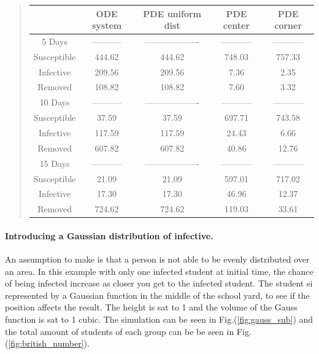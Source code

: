 \documentclass[%
twoside,                 %
final,                   %
10pt]{article}
\begin{document}
\label{table:british_number_table}

\begin{quote}
\begin{tabular}{ccccc}
\hline
\multicolumn{1}{c}{  } & \multicolumn{1}{c}{ ODE system } & \multicolumn{1}{c}{ PDE uniform dist } & \multicolumn{1}{c}{ PDE center } & \multicolumn{1}{c}{ PDE corner } \\
\hline
5 Days              & -----------         & ------------------- & -----------         & -----------         \\
\hline
Susceptible         & 444.62              & 444.62              & 748.03              & 757.33              \\
Infective           & 209.56              & 209.56              & 7.36                & 2.35                \\
Removed             & 108.82              & 108.82              & 7.60                & 3.32                \\
\hline
10 Days             & -----------         & ------------------- & -----------         & -----------         \\
\hline
Susceptible         & 37.59               & 37.59               & 697.71              & 743.58              \\
Infective           & 117.59              & 117.59              & 24.43               & 6.66                \\
Removed             & 607.82              & 607.82              & 40.86               & 12.76               \\
\hline
15 Days             & -----------         & ------------------- & -----------         & -----------         \\
\hline
Susceptible         & 21.09               & 21.09               & 597.01              & 717.02              \\
Infective           & 17.30               & 17.30               & 46.96               & 12.37               \\
Removed             & 724.62              & 724.62              & 119.03              & 33.61               \\
\hline
\end{tabular}
\end{quote}

\noindent

\paragraph{Introducing a Gaussian distribution of infective.}
An assumption to make is that a person is not able to be evenly distributed over an area. In this example with only one infected student at initial time, the chance of being infected increase as closer you get to the infected student. The student si represented by a Gaussian function in the middle of the school yard, to see if the position affects the result. The height is sat to 1 and the volume of the Gauss function is sat to 1 cubic. The simulation can be seen in Fig.(\ref{fig:gauss_sub}) and the total amount of students of each group can be be seen in Fig.(\ref{fig:british_number}).
\end{document}
